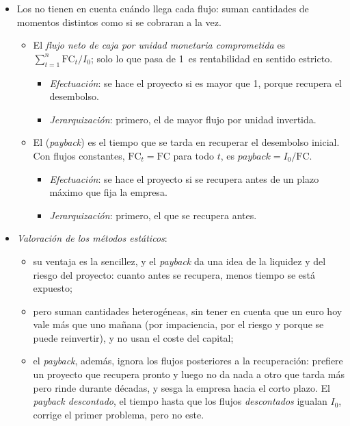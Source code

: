 \documentclass[11pt]{article}
\begin{document}
\begin{itemize}
\item Los  no tienen en cuenta cuándo llega cada flujo: suman cantidades de momentos distintos como si se cobraran a la vez.
  \begin{itemize}
  \item El \emph{flujo neto de caja por unidad monetaria comprometida} es $\sum_{t=1}^{n}\mathrm{FC}_t/I_0$; solo lo que pasa de 1~es rentabilidad en sentido estricto.
    \begin{itemize}
    \item \emph{Efectuación}: se hace el proyecto si es mayor que 1, porque recupera el desembolso.
    \item \emph{Jerarquización}: primero, el de mayor flujo por unidad invertida.
    \end{itemize}
  \item El  (\emph{payback}) es el tiempo que se tarda en recuperar el desembolso inicial. Con flujos constantes, $\mathrm{FC}_t=\mathrm{FC}$ para todo $t$, es $\textit{payback}=I_0/\mathrm{FC}$.
    \begin{itemize}
    \item \emph{Efectuación}: se hace el proyecto si se recupera antes de un plazo máximo que fija la empresa.
    \item \emph{Jerarquización}: primero, el que se recupera antes.
    \end{itemize}
  \end{itemize}
\item \emph{Valoración de los métodos estáticos}:
  \begin{itemize}
  \item su ventaja es la sencillez, y el \emph{payback} da una idea de la liquidez y del riesgo del proyecto: cuanto antes se recupera, menos tiempo se está expuesto;
  \item pero suman cantidades heterogéneas, sin tener en cuenta que un euro hoy vale más que uno mañana (por impaciencia, por el riesgo y porque se puede reinvertir), y no usan el coste del capital;
  \item el \emph{payback}, además, ignora los flujos posteriores a la recuperación: prefiere un proyecto que recupera pronto y luego no da nada a otro que tarda más pero rinde durante décadas, y sesga la empresa hacia el corto plazo. El \emph{payback descontado}, el tiempo hasta que los flujos \emph{descontados} igualan $I_0$, corrige el primer problema, pero no este\nocite{BrealeyMyersAllen2020Principles}.
  \end{itemize}
\end{itemize}
\end{document}
